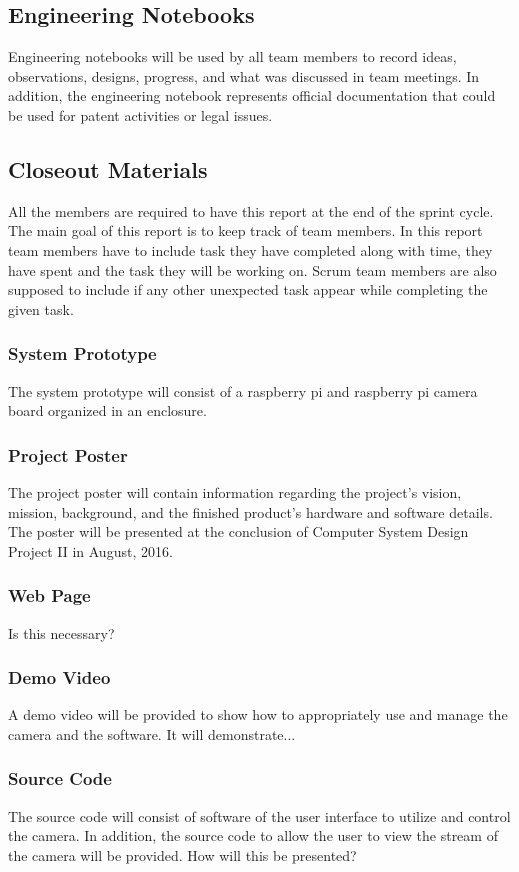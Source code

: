 \subsection{Engineering Notebooks}
Engineering notebooks will be used by all team members to record ideas, observations, designs, progress, and what was discussed in team meetings. In addition, the engineering notebook represents official documentation that could be used for patent activities or legal issues. 

\subsection{Closeout Materials}
All the members are required to have this report at the end of the sprint cycle. The main goal of this report is to keep track of team members. In this report team members have to include task they have completed along with time, they have spent and the task they will be working on. Scrum team members are also supposed to include if any other unexpected task appear while completing the given task.

\subsubsection{System Prototype}
The system prototype will consist of a raspberry pi and raspberry pi camera board organized in an enclosure. 

\subsubsection{Project Poster}
The project poster will contain information regarding the project’s vision, mission, background, and the finished product’s hardware and software details. The poster will be presented at the conclusion of Computer System Design Project II in August, 2016. 

\subsubsection{Web Page}
Is this necessary?

\subsubsection{Demo Video}
A demo video will be provided to show how to appropriately use and manage the camera and the software. It will demonstrate...

\subsubsection{Source Code}
The source code will consist of software of the user interface to utilize and control the camera. In addition, the source code to allow the user to view the stream of the camera will be provided.  How will this be presented?

